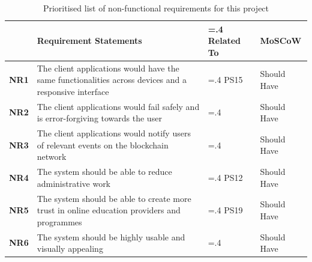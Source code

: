 \begin{table}[!h]
	\caption{Prioritised list of non-functional requirements for this project}
	\centering
	\label{table:nonfx-reqs}
	\begin{tabularx}{\textwidth}{>{\bfseries}l>{\hsize=1.6\hsize}X>{\hsize=.4\hsize}Xl}
		                       & Requirement Statements                                                          & Related To  & MoSCoW
		\\\toprule
		NR1                    & The client applications would have the same functionalities across devices and
		a responsive interface & PS15                                                                            & Should Have
		\\\midrule
		NR2                    & The client applications would fail safely and is error-forgiving
		towards the user       &                                                                                 & Should Have
		\\\midrule
		NR3                    & The client applications would notify users of relevant events on the blockchain
		network                &                                                                                 & Should Have
		\\\midrule
		NR4                    & The system should be able to reduce administrative work                         & PS12        & Should Have
		\\\midrule
		NR5                    & The system should be able to create more trust in online education providers
		and programmes         & PS19                                                                            & Should Have
		\\\midrule
		NR6                    & The system should be highly usable and visually appealing                       &             & Should Have
		\\\bottomrule
	\end{tabularx}
\end{table}